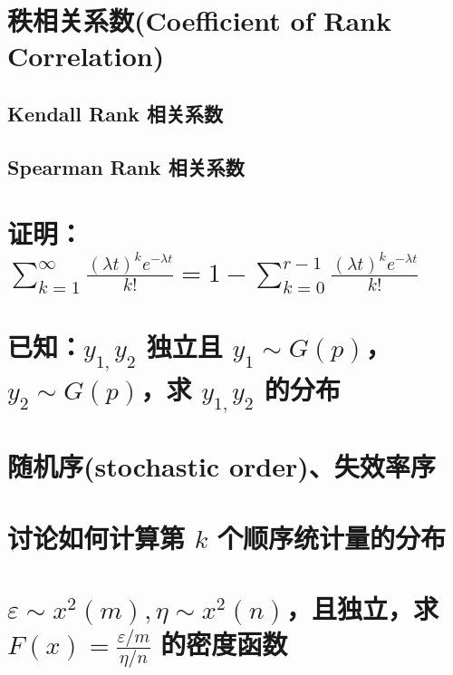\documentclass[UTF-8]{ctexart}
\begin{document}
\section{秩相关系数(Coefficient of Rank Correlation)}

\subsection{Kendall Rank 相关系数}

\subsection{Spearman Rank 相关系数}


\section{证明：$\sum _ { k = 1 } ^ { \infty } \frac { ( \lambda t ) ^ { k } e ^ { - \lambda t } } { k ! }= 1 - \sum _ { k = 0 } ^ { r - 1 } \frac { ( \lambda t ) ^ { k } e ^ { - \lambda t } } { k ! }$}


\section{已知：$y _ { 1 , } y _ { 2 }$ 独立且 $y _ { 1 } \sim G ( p )$，$ y _ { 2 } \sim G ( p )$，求 $y _ { 1 , } y _ { 2 }$ 的分布}


\section{随机序(stochastic order)、失效率序}


\section{讨论如何计算第 $k$ 个顺序统计量的分布}


\section{$\varepsilon \sim x ^ { 2 } ( m ) , \eta \sim x ^ { 2 } ( n )$，且独立，求 $F ( x ) = \frac { \varepsilon / m } { \eta / n }$ 的密度函数}
\end{document}
